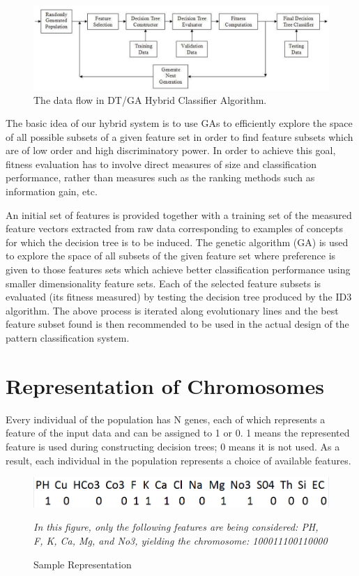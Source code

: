\documentclass[12pt]{report}
\begin{document}
\begin{figure}[h!]  
  \centering
    \includegraphics[scale=0.40]{dfd.png}
\caption{The data flow in DT/GA Hybrid Classifier Algorithm.}
\end{figure}

The basic idea of our hybrid system is to use GAs to
efficiently explore the space of all possible subsets of a given
feature set in order to find feature subsets which are of low
order and high discriminatory power. In order to achieve this
goal, fitness evaluation has to involve direct
measures of size and classification performance, rather than
measures such as the ranking methods such as information gain, etc.

An initial set of features is provided together with a training
set of the measured feature vectors extracted from raw data
corresponding to examples of concepts for which the decision
tree is to be induced. The genetic algorithm (GA) is used to
explore the space of all subsets of the given feature set where
preference is given to those features sets which achieve better
classification performance using smaller dimensionality feature
sets. Each of the selected feature subsets is evaluated (its
fitness measured) by testing the decision tree produced by the ID3 algorithm. The above process is iterated along evolutionary
lines and the best feature subset found is then recommended to
be used in the actual design of the pattern classification
system.


\section{Representation of Chromosomes}
Every individual of the population has N genes, each of which represents a feature of the input data and can be assigned to 1 or 0. 
1 means the represented feature is used during constructing decision trees; 0 means it is not used. As a result, each individual in the population represents a choice of available features. 

\begin{figure}[h!]  
  \centering
    \includegraphics[scale=0.70]{featurechromosome.png}
\caption{Sample Representation}
\textit{In this figure, only the following features are being considered: PH, F, K, Ca, Mg, and No3, yielding the chromosome: 100011100110000}
\end{figure}
\end{document}

